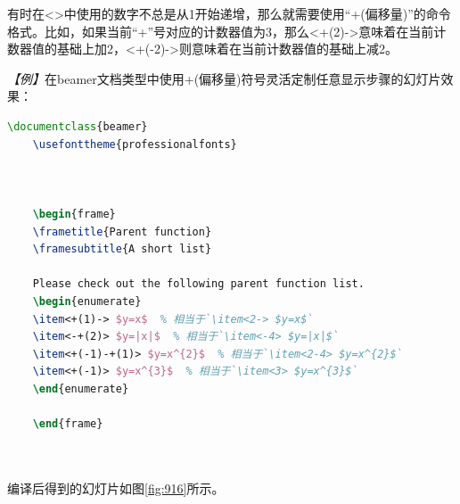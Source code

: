有时在<>中使用的数字不总是从1开始递增，那么就需要使用“+(偏移量)”的命令格式。比如，如果当前“+”号对应的计数器值为3，那么<+(2)->意味着在当前计数器值的基础上加2，<+(-2)->则意味着在当前计数器值的基础上减2。

\emph{【例】}在beamer文档类型中使用+(偏移量)符号灵活定制任意显示步骤的幻灯片效果：
\begin{lstlisting}[language=TeX]
    \documentclass{beamer}
    \usefonttheme{professionalfonts}

    

    \begin{frame}
    \frametitle{Parent function}
    \framesubtitle{A short list}

    Please check out the following parent function list.
    \begin{enumerate}
    \item<+(1)-> $y=x$  % 相当于`\item<2-> $y=x$`
    \item<-+(2)> $y=|x|$  % 相当于`\item<-4> $y=|x|$`
    \item<+(-1)-+(1)> $y=x^{2}$  % 相当于`\item<2-4> $y=x^{2}$`
    \item<+(-1)> $y=x^{3}$  % 相当于`\item<3> $y=x^{3}$`
    \end{enumerate}

    \end{frame}

    
\end{lstlisting}

编译后得到的幻灯片如图\ref{fig:916}所示。

